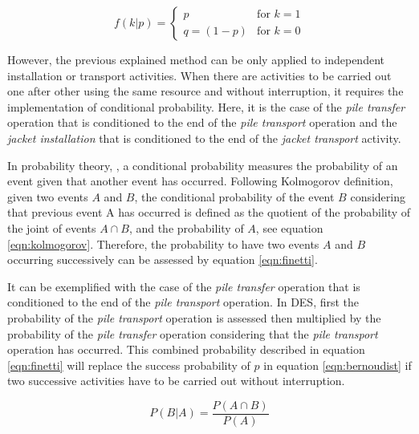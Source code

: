 \begin{equation}
\label{eqn:bernoudist}
f\left(k \vert p \right) = \begin{cases} p & \text{for $k=1$} \\ q=(1-p) & \text{for $k=0$} \end{cases}
\end{equation}

However, the previous explained method can be only applied to independent installation or transport activities. When there are activities to be carried out one after other using the same resource and without interruption, it requires the implementation of conditional probability. Here, it is the case of the \textit{pile transfer} operation that is conditioned to the end of the \textit{pile transport} operation and the \textit{jacket installation} that is conditioned to the end of the \textit{jacket transport} activity.

In probability theory, \cite{Thalemann2012}, a conditional probability measures the probability of an event given that another event has occurred. Following Kolmogorov definition, given two events $A$ and $B$, the conditional probability of the event $B$ considering that previous event A has occurred is defined as the quotient of the probability of the joint of events $A \cap B$, and the probability of $A$, see equation \ref{eqn:kolmogorov}. Therefore, the probability to have two events $A$ and $B$ occurring successively can be assessed by equation \ref{eqn:finetti}.

It can be exemplified with the case of the \textit{pile transfer} operation that is conditioned to the end of the \textit{pile transport} operation. In DES, first the probability of the \textit{pile transport} operation is assessed then multiplied by the probability of the \textit{pile transfer} operation considering that the \textit{pile transport} operation has occurred.  This combined probability  described in equation \ref{eqn:finetti} will replace the success probability of $p$ in equation \ref{eqn:bernoudist} if two successive activities have to be carried out without interruption.

\begin{equation}
\label{eqn:kolmogorov}
P \left(B \vert A \right) = \frac{P \left(A \cap B \right)}{P \left( A \right)}
\end{equation}

